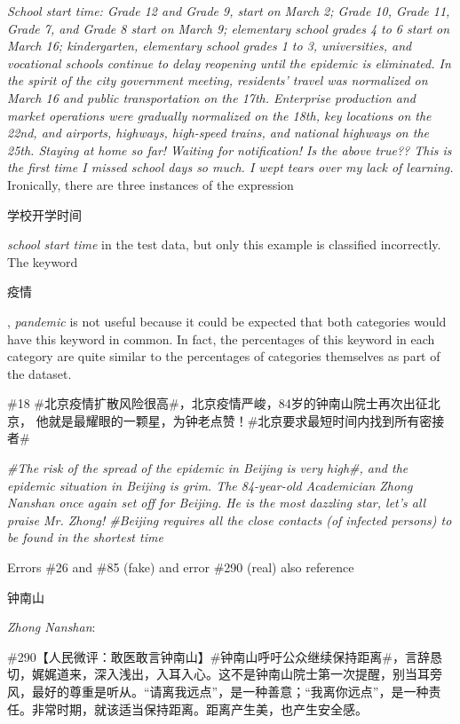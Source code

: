 \documentclass [11pt, proquest] {uwthesis}[2020/02/24]
\begin{document}
\textit{School start time: Grade 12 and Grade 9, start on March 2; Grade 10, Grade 11, Grade 7, and Grade 8 start on March 9; elementary school grades 4 to 6 start on March 16; kindergarten, elementary school grades 1 to 3, universities, and vocational schools continue to delay reopening until the epidemic is eliminated. In the spirit of the city government meeting, residents' travel was normalized on March 16 and public transportation on the 17th. Enterprise production and market operations were gradually normalized on the 18th, key locations on the 22nd, and airports, highways, high-speed trains, and national highways on the 25th. Staying at home so far! Waiting for notification! Is the above true?? This is the first time I missed school days so much. I wept tears over my lack of learning.}
\newpage
Ironically, there are three instances of the expression 
\begin{CJK*}{UTF8}{gbsn}学校开学时间\end{CJK*} \textit{school start time} in the test data, but only this example is classified incorrectly. The keyword \begin{CJK*}{UTF8}{gbsn}疫情\end{CJK*}, \textit{pandemic} is not useful because it could be expected that both categories would have this keyword in common. In fact, the percentages of this keyword in each category are quite similar to the percentages of categories themselves as part of the dataset.


\begin{CJK*}{UTF8}{gbsn} \#18 \#北京疫情扩散风险很高\#，北京疫情严峻，84岁的钟南山院士再次出征北京， 他就是最耀眼的一颗星，为钟老点赞！\#北京要求最短时间内找到所有密接者\#\end{CJK*}

\textit{\#The risk of the spread of the epidemic in Beijing is very high\#, and the epidemic situation in Beijing is grim. The 84-year-old Academician Zhong Nanshan once again set off for Beijing. He is the most dazzling star, let's all praise Mr. Zhong!
\#Beijing requires all the close contacts (of infected persons) to be found in the shortest time}

Errors \#26 and \#85 (fake) and error \#290 (real) also reference \begin{CJK*}{UTF8}{gbsn}钟南山\end{CJK*} \textit{Zhong Nanshan}: 

\begin{CJK*}{UTF8}{gbsn} \#290【人民微评：敢医敢言钟南山】\#钟南山呼吁公众继续保持距离\#，言辞恳切，娓娓道来，深入浅出，入耳入心。这不是钟南山院士第一次提醒，别当耳旁风，最好的尊重是听从。“请离我远点”，是一种善意；“我离你远点”，是一种责任。非常时期，就该适当保持距离。距离产生美，也产生安全感。\end{CJK*}
\end{document}
